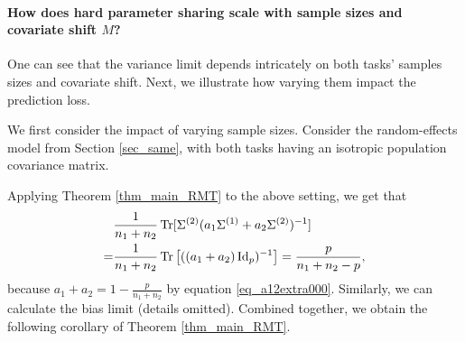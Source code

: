 \paragraph{How does hard parameter sharing scale with sample sizes and covariate shift $M$?}
One can see that the variance limit depends intricately on both tasks' samples sizes and covariate shift.
Next, we illustrate how varying them impact the prediction loss.
\begin{example}\label{ex_sample_ratio}
	We first consider the impact of varying sample sizes.
	Consider the random-effects model from Section \ref{sec_same}, with both tasks having an isotropic population covariance matrix.

	Applying Theorem \ref{thm_main_RMT} to the above setting, we get that
	\begin{align*}
		&\frac{1}{n_1 + n_2} \operatorname{Tr}[\Sigma^{(2)} (a_1\Sigma^{(1)} + a_2\Sigma^{(2)})^{-1}] \\
		=& \frac{1}{n_1 + n_2} \operatorname{Tr}\left[((a_1 + a_2)\operatorname{Id}_p)^{-1}\right]
		= \frac{p}{n_1 + n_2 - p},
	\end{align*}
	because $a_1 + a_2 = 1 - \frac{p}{n_1 + n_2}$ by equation \eqref{eq_a12extra000}.
	Similarly, we can calculate the bias limit (details omitted).
	Combined together, we obtain the following corollary of Theorem \ref{thm_main_RMT}.
\end{example}


